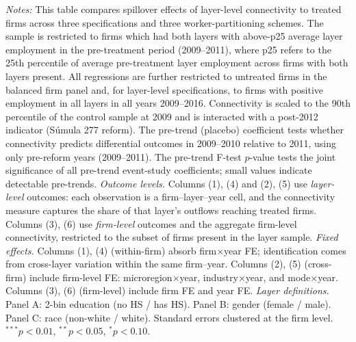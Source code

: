 \begin{table}[H]
\begin{threeparttable}
\begin{tablenotes}[flushleft]
\item \textit{Notes:} This table compares spillover effects of layer-level connectivity to treated firms across three specifications and three worker-partitioning schemes. The sample is restricted to firms which had both layers with above-p25 average layer employment in the pre-treatment period (2009--2011), where p25 refers to the 25th percentile of average pre-treatment layer employment across firms with both layers present. All regressions are further restricted to untreated firms in the balanced firm panel and, for layer-level specifications, to firms with positive employment in all layers in all years 2009--2016. Connectivity is scaled to the 90th percentile of the control sample at 2009 and is interacted with a post-2012 indicator (S\'{u}mula 277 reform). The pre-trend (placebo) coefficient tests whether connectivity predicts differential outcomes in 2009--2010 relative to 2011, using only pre-reform years (2009--2011). The pre-trend F-test $p$-value tests the joint significance of all pre-trend event-study coefficients; small values indicate detectable pre-trends. \textit{Outcome levels.} Columns (1), (4) and (2), (5) use \textit{layer-level} outcomes: each observation is a firm--layer--year cell, and the connectivity measure captures the share of that layer's outflows reaching treated firms. Columns (3), (6) use \textit{firm-level} outcomes and the aggregate firm-level connectivity, restricted to the subset of firms present in the layer sample. \textit{Fixed effects.} Columns (1), (4) (within-firm) absorb firm$\times$year FE; identification comes from cross-layer variation within the same firm--year. Columns (2), (5) (cross-firm) include firm-level FE: microregion$\times$year, industry$\times$year, and mode$\times$year. Columns (3), (6) (firm-level) include firm FE and year FE. \textit{Layer definitions.} Panel A: 2-bin education (no HS / has HS). Panel B: gender (female / male). Panel C: race (non-white / white). Standard errors clustered at the firm level. $^{***}p<0.01$, $^{**}p<0.05$, $^{*}p<0.10$.
\end{tablenotes}
\end{threeparttable}
\end{table}